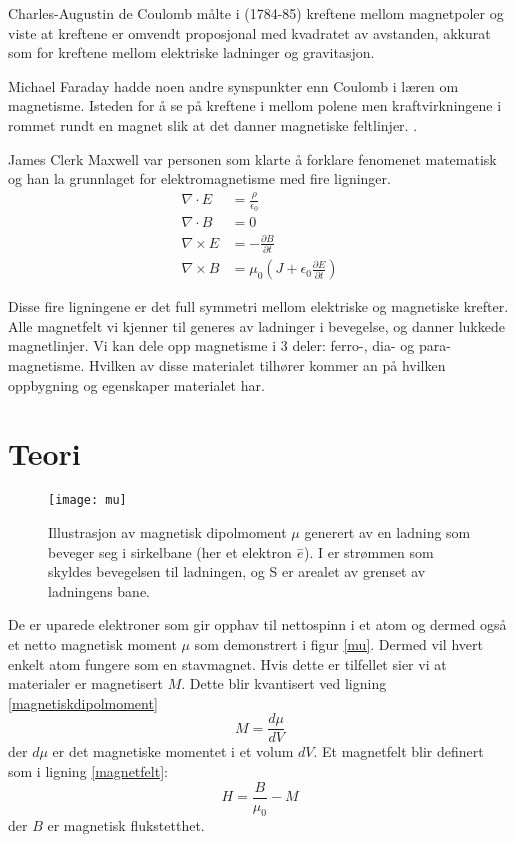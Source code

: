 \documentclass[norsk,a4paper,12pt]{article}
\begin{document}
Charles-Augustin de Coulomb målte i (1784-85) kreftene mellom magnetpoler og viste at kreftene er omvendt proposjonal med kvadratet av avstanden, akkurat som for kreftene mellom elektriske ladninger og gravitasjon.

Michael Faraday hadde noen andre synspunkter enn Coulomb i læren om magnetisme. Isteden for å se på kreftene i mellom polene men kraftvirkningene i rommet rundt en magnet slik at det danner magnetiske feltlinjer.  \cite{snl}. 

James Clerk Maxwell var personen som klarte å forklare fenomenet matematisk og han la grunnlaget for elektromagnetisme med fire ligninger. 
\begin{align*}
\nabla \cdot E &= \frac{\rho}{\epsilon_0}\\
\nabla \cdot B &= 0\\
\nabla \times E &= -\frac{\partial B}{\partial t} \\
\nabla \times B &= \mu_0\left(J + \epsilon_0\frac{\partial E}{\partial t} \right)
\end{align*}

Disse fire ligningene er det full symmetri mellom elektriske og magnetiske krefter. Alle magnetfelt vi kjenner til generes av ladninger i bevegelse, og danner lukkede magnetlinjer. Vi kan dele opp magnetisme i 3 deler: ferro-, dia- og para-magnetisme. Hvilken av disse materialet tilhører kommer an på hvilken oppbygning og egenskaper materialet har. 






\section{Teori}
\begin{wrapfigure}{r}{0.5\textwidth}
	\begin{center}
  	\texttt{[image: mu]}\\
	\caption[Magnetisk dipolmoment]{Illustrasjon av magnetisk dipolmoment $\mu$ generert av en ladning som beveger seg i sirkelbane (her et elektron $\overset{-}{e}$). I er strømmen som skyldes bevegelsen til ladningen, og S er arealet av grenset av ladningens bane. }
	\label{mu}
	\end{center}
\end{wrapfigure}
De er uparede elektroner som gir opphav til nettospinn i et atom og dermed også et netto magnetisk moment $\mu$ som demonstrert i figur \vref{mu}. Dermed vil hvert enkelt atom fungere som en stavmagnet. Hvis dette er tilfellet sier vi at materialer er magnetisert $M$. Dette blir kvantisert ved ligning \ref{magnetiskdipolmoment}
\begin{equation}
M = \frac{d\mu}{dV}
\label{magnetiskdipolmoment}
\end{equation}
 der $d\mu$ er det magnetiske momentet i et volum $dV$. Et magnetfelt blir definert som i ligning \ref{magnetfelt}:
\begin{equation}
H = \frac{B}{\mu_0} - M
\label{magnetfelt}
\end{equation}
der $B$ er magnetisk flukstetthet.
\end{document}
